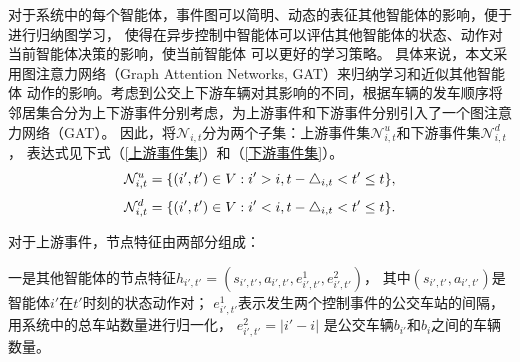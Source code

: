 对于系统中的每个智能体，事件图可以简明、动态的表征其他智能体的影响，便于进行归纳图学习，
使得在异步控制中智能体可以评估其他智能体的状态、动作对当前智能体决策的影响，使当前智能体
可以更好的学习策略。
具体来说，本文采用图注意力网络（Graph Attention Networks, GAT）来归纳学习和近似其他智能体
动作的影响。考虑到公交上下游车辆对其影响的不同，根据车辆的发车顺序将邻居集合分为上下游事件分别考虑，为上游事件和下游事件分别引入了一个图注意力网络（GAT）。
因此，将$\mathcal{N} _{i,t}$分为两个子集：上游事件集$ \mathcal{N}^u_{i,t} $和下游事件集$ \mathcal{N}^d_{i,t}$，
表达式见下式（\ref{上游事件集}）和（\ref{下游事件集}）。
\begin{equation}\label{上游事件集}
    \\\mathcal{N}^u_{i,t}=\{(i',t') \in V : i'> i,t-\triangle_{i,t}<t'\leq t\},
\end{equation}
\begin{equation}\label{下游事件集}
    \\\mathcal{N}^d_{i,t}=\{(i',t') \in V : i'< i,t-\triangle_{i,t}<t'\leq t\}.
\end{equation}

对于上游事件，节点特征由两部分组成：

一是其他智能体的节点特征$h_{i',t'}=(s_{i',t'},a_{i',t'},e^1_{i',t'},e^2_{i',t'})$，
其中$(s_{i',t'},a_{i',t'})$是智能体$i'$在$t'$时刻的状态动作对；
$e^1_{i',t'}$表示发生两个控制事件的公交车站的间隔，用系统中的总车站数量进行归一化，
$e^2_{i',t'} = |i'- i|$ 是公交车辆$b_{i'}$和$b_i$之间的车辆数量。

